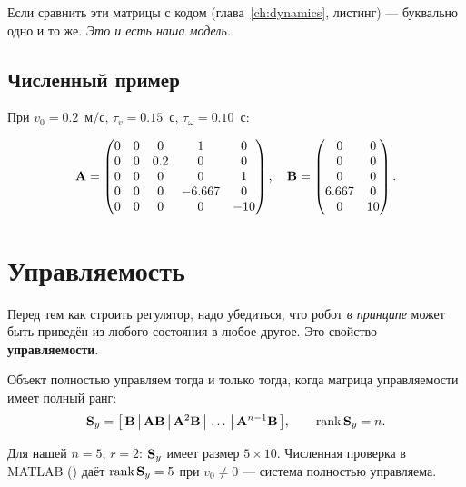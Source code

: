 Если сравнить эти матрицы с кодом 
(глава~\ref{ch:dynamics}, листинг) --- буквально одно и то же.
\emph{Это и есть наша модель.}

\subsection{Численный пример}

При $v_0 = 0.2$~м/с, $\tau_v = 0.15$~с, $\tau_\omega = 0.10$~с:

\begin{equation}
  \mathbf{A} = \begin{pmatrix}
    0 & 0 & 0    & 1      & 0 \\
    0 & 0 & 0.2  & 0      & 0 \\
    0 & 0 & 0    & 0      & 1 \\
    0 & 0 & 0    & -6.667 & 0 \\
    0 & 0 & 0    & 0      & -10
  \end{pmatrix},
  \quad
  \mathbf{B} = \begin{pmatrix}
    0      & 0 \\
    0      & 0 \\
    0      & 0 \\
    6.667  & 0 \\
    0      & 10
  \end{pmatrix}.
  \label{eq:AB_numeric}
\end{equation}

\section{Управляемость}

Перед тем как строить регулятор, надо убедиться, что робот \emph{в принципе}
может быть приведён из любого состояния в любое другое. Это свойство
\textbf{управляемости}.

\begin{formulabox}[title={Критерий Калмана}]
Объект полностью управляем тогда и только тогда, когда матрица
управляемости имеет полный ранг:
\begin{equation}
  \mathbf{S}_y = \big[\,\mathbf{B}\,\big|\,\mathbf{A}\mathbf{B}\,\big|\,\mathbf{A}^2\mathbf{B}
              \,\big|\,\ldots\,\big|\,\mathbf{A}^{n-1}\mathbf{B}\,\big],
  \qquad
  \operatorname{rank} \mathbf{S}_y = n.
  \label{eq:controllability}
\end{equation}
\end{formulabox}

Для нашей $n = 5$, $r = 2$: $\mathbf{S}_y$ имеет размер $5 \times 10$.
Численная проверка в MATLAB () даёт
$\operatorname{rank} \mathbf{S}_y = 5$ при $v_0 \ne 0$ --- система полностью управляема.

